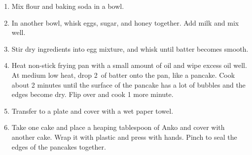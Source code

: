 \label{どら焼き}

\begin{ingredients}
\end{ingredients}


\begin{recipe}
  \begin{enumerate}

  \item Mix flour and baking soda in a bowl.

  \item In another bowl, whisk eggs, sugar, and honey together. Add
    milk and mix well.
    
  \item Stir dry ingredients into egg mixture, and whisk until batter
    becomes smooth.
    
  \item Heat non-stick frying pan with a small amount of oil and wipe
    excess oil well. At medium low heat, drop 2~\tbsp of batter onto
    the pan, like a pancake. Cook about 2 minutes until the surface of
    the pancake has a lot of bubbles and the edges become dry. Flip
    over and cook 1 more minute.
    
  \item Transfer to a plate and cover with a wet paper towel.
    
  \item Take one cake and place a heaping tablespoon of Anko and cover
    with another cake. Wrap it with plastic and press with
    hands. Pinch to seal the edges of the pancakes together.

  \end{enumerate}
\end{recipe}

